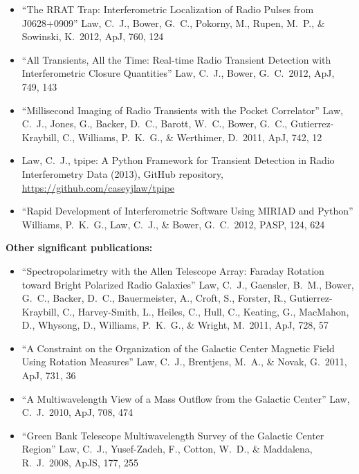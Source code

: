 \documentclass[11pt]{article}
\begin{document}
\begin{itemize}
 \item ``The RRAT Trap: Interferometric Localization of Radio Pulses from J0628+0909'' Law, C.~J., Bower, G.~C., Pokorny, M., Rupen, M.~P., \& Sowinski, K.\ 2012, ApJ, 760, 124

 \item ``All Transients, All the Time: Real-time Radio Transient Detection with Interferometric Closure Quantities'' Law, C.~J., Bower, G.~C.\ 2012, ApJ, 749, 143

 \item ``Millisecond Imaging of Radio Transients with the Pocket Correlator'' Law, C.~J., Jones, G., Backer, D.~C., Barott, W.~C., Bower, G.~C., Gutierrez-Kraybill, C., Williams, P.~K.~G., \& Werthimer, D.\ 2011, ApJ, 742, 12

 \item Law, C.~J., tpipe: A Python Framework for Transient Detection in Radio Interferometry Data (2013), GitHub repository, \url{https://github.com/caseyjlaw/tpipe}

 \item ``Rapid Development of Interferometric Software Using MIRIAD and Python'' Williams, P.~K.~G., Law, C.~J., \& Bower, G.~C.\ 2012, PASP, 124, 624 

\end{itemize}

{\bf Other significant publications:}

\begin{itemize}
 \item ``Spectropolarimetry with the Allen Telescope Array:  Faraday Rotation toward Bright Polarized Radio Galaxies'' Law, C.~J., Gaensler, B.~M., Bower, G.~C., Backer, D.~C., Bauermeister, A., Croft, S., Forster, R., Gutierrez-Kraybill, C., Harvey-Smith, L., Heiles, C., Hull, C., Keating, G., MacMahon, D., Whysong, D., Williams, P.~K.~G., \& Wright, M.\ 2011, ApJ, 728, 57

 \item ``A Constraint on the Organization of the Galactic Center Magnetic Field Using Rotation Measures'' Law, C.~J., Brentjens, M.~A., \& Novak, G.\ 2011, ApJ, 731, 36

 \item ``A Multiwavelength View of a Mass Outflow from the Galactic Center'' Law, C.~J.\ 2010, ApJ, 708, 474

 \item ``Green Bank Telescope Multiwavelength Survey of the Galactic Center Region'' Law, C.~J., Yusef-Zadeh, F., Cotton, W.~D., \& Maddalena, R.~J.\ 2008, ApJS, 177, 255

\end{itemize}
\end{document}
